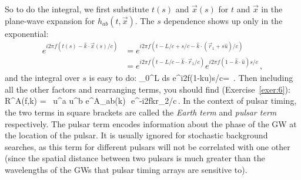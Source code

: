 So to do the integral, we first substitute $t(s)$ and 
$\vec x(s)$ for $t$ and $\vec x$ in the plane-wave 
expansion for $h_{ab}(t,\vec x)$.
The $s$ dependence shows up only in the exponential:
%
\begin{equation}
\begin{aligned}
e^{i2\pi f(t(s)-\hat k\cdot\vec x(s)/c)}
&= e^{i2\pi f(t-L/c + s/c -\hat k\cdot(\vec r_1 + s\hat u)/c)}
\\
&= e^{i2\pi f(t-L/c -\hat k\cdot\vec r_1/c)}
e^{i2\pi f(1 -\hat k\cdot\hat u)s/c}\,,
\end{aligned}
\end{equation}
%
and the integral over $s$ is easy to do:
%
\be
\int_0^L {\rm d}s\>
e^{i2\pi f(1-\hat k\cdot\hat u)s/c}=
\,.
\ee
Then including all the other factors and rearranging terms, 
you should find (Exercise~\ref{exer:6}):
%
\be
R^A(f,\hat k) = \,
u^a u^b e^A_{ab}(\hat k)\,
\,e^{-i2\pi f\hat k\cdot\vec r_2/c}\,.
\label{e:response_one_arm_one_way}
\ee
%
In the context of pulsar timing, the two terms in square brackets 
are called the {\em Earth term} and {\em pulsar term} respectively.
The pulsar term encodes information about the phase of the GW at
the location of the pulsar.
It is usually ignored for stochastic background searches, as 
this term for different pulsars will not be correlated with one other
(since the spatial distance between two pulsars is much greater than
the wavelengths of the GWs that pulsar timing arrays are 
sensitive to).


